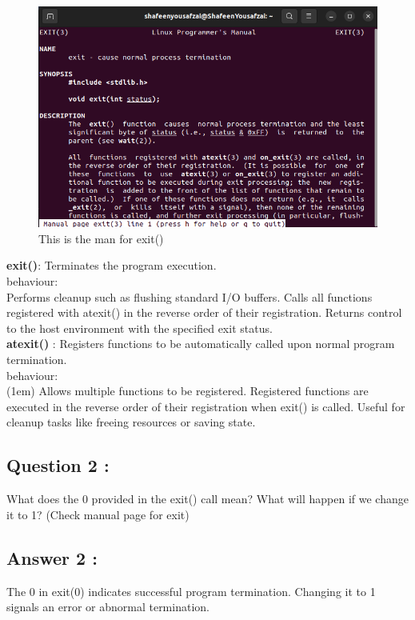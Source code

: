 \documentclass[12pt]{article}
\begin{document}
\begin{figure}[H]
    \centering
    \includegraphics[width=\textwidth]{12.png}
    \caption{This is the man for exit()}
    \label{fig:enter-label}
\end{figure}


\textbf{exit()}: Terminates the program execution.\\
behaviour:  \\
        Performs cleanup such as flushing standard I/O buffers.
        Calls all functions registered with atexit() in the reverse order of their registration.
        Returns control to the host environment with the specified exit status.\\
\textbf{atexit()} : Registers functions to be automatically called upon normal program termination.\\
behaviour: \\
\hfill(1em)        Allows multiple functions to be registered.
        Registered functions are executed in the reverse order of their registration when exit() is called.
        Useful for cleanup tasks like freeing resources or saving state.


\subsection{Question 2 :}
What does the 0 provided in the exit() call
mean? What will happen if we change it
to 1? (Check manual page for exit)
\subsection{Answer 2 :}
The 0 in exit(0) indicates successful program termination. Changing it to 1 signals an error or abnormal termination.
\end{document}
